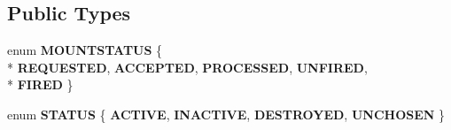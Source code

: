 \subsection*{Public Types}
\begin{DoxyCompactItemize}
\item 
enum {\bfseries M\+O\+U\+N\+T\+S\+T\+A\+T\+US} \{ \\*
{\bfseries R\+E\+Q\+U\+E\+S\+T\+ED}, 
{\bfseries A\+C\+C\+E\+P\+T\+ED}, 
{\bfseries P\+R\+O\+C\+E\+S\+S\+ED}, 
{\bfseries U\+N\+F\+I\+R\+ED}, 
\\*
{\bfseries F\+I\+R\+ED}
 \}\hypertarget{classMount_a6fd8fbe3a8088121a30ddfc65486ac56}{}\label{classMount_a6fd8fbe3a8088121a30ddfc65486ac56}

\item 
enum {\bfseries S\+T\+A\+T\+US} \{ {\bfseries A\+C\+T\+I\+VE}, 
{\bfseries I\+N\+A\+C\+T\+I\+VE}, 
{\bfseries D\+E\+S\+T\+R\+O\+Y\+ED}, 
{\bfseries U\+N\+C\+H\+O\+S\+EN}
 \}\hypertarget{classMount_a778c45e2da092b9c69a09023452351cb}{}\label{classMount_a778c45e2da092b9c69a09023452351cb}

\end{DoxyCompactItemize}
